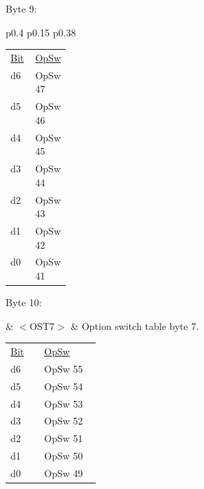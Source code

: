 Byte 9:

\begin{tabular}{p{0.4\linewidth} p{0.15\linewidth} p{0.38\linewidth}} 

\begin{tabular}{|p{0.3cm}|p{0.3cm}|p{0.3cm}|p{0.3cm}|p{0.3cm}|p{0.3cm}|p{0.3cm}|p{0.3cm}|}
\hline
0 & d6 & d5 & d4 & d3 & d2 & d1 & d0\\
\hline
\end{tabular}
& $<$OST6$>$ & Option switch table byte 6.\\
\end{tabular}

\begin{tabular}{p{0.05\linewidth} p{0.1\linewidth} } 
\underline{Bit} & \underline{OpSw} \\
d6 & OpSw 47\\
d5 & OpSw 46\\
d4 & OpSw 45\\
d3 & OpSw 44\\
d2 & OpSw 43\\
d1 & OpSw 42\\
d0 & OpSw 41\\
\end{tabular}

Byte 10:

& $<$OST7$>$ & Option switch table byte 7.\\
\end{tabular}

\begin{tabular}{p{0.05\linewidth} p{0.1\linewidth} } 
\underline{Bit} & \underline{OpSw} \\
d6 & OpSw 55\\
d5 & OpSw 54\\
d4 & OpSw 53\\
d3 & OpSw 52\\
d2 & OpSw 51\\
d1 & OpSw 50\\
d0 & OpSw 49\\
\end{tabular}

